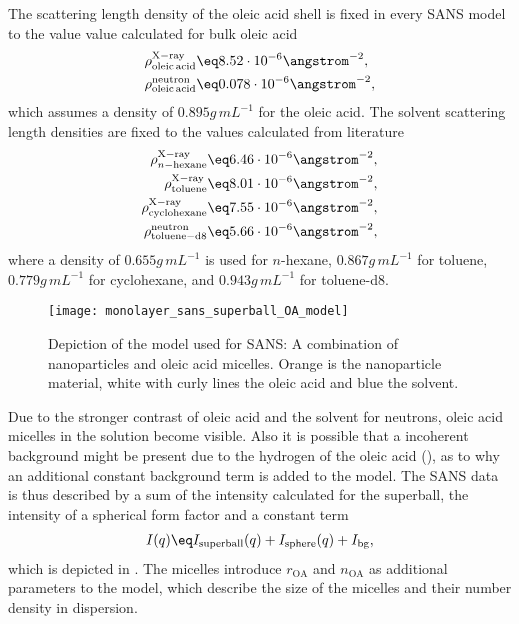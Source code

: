 \documentclass[\main/dresen_thesis.tex]{subfiles}
\begin{document}
    The scattering length density of the oleic acid shell is fixed in every SANS model to the value value calculated for bulk oleic acid
    \begin{align}
      \rho^\mathrm{X-ray}_\mathrm{oleic\,acid} &\eq 8.52 \cdot 10^{-6} \angstrom^{-2},\\
      \rho^\mathrm{neutron}_\mathrm{oleic\,acid} &\eq 0.078 \cdot 10^{-6} \angstrom^{-2},
    \end{align}
    which assumes a density of $0.895 \unit{g\,mL^{-1}}$ for the oleic acid.
    The solvent scattering length densities are fixed to the values calculated from literature
    \begin{align}
      \rho^\mathrm{X-ray}_{n\mathrm{-hexane}}    &\eq 6.46 \cdot 10^{-6} \angstrom^{-2},\\
      \rho^\mathrm{X-ray}_\mathrm{toluene}       &\eq 8.01 \cdot 10^{-6} \angstrom^{-2},\\
      \rho^\mathrm{X-ray}_{\mathrm{cyclohexane}} &\eq 7.55 \cdot 10^{-6} \angstrom^{-2},\\
      \rho^\mathrm{neutron}_\mathrm{toluene-d8}  &\eq 5.66 \cdot 10^{-6} \angstrom^{-2},
    \end{align}
    where a density of $0.655 \unit{g\,mL^{-1}}$ is used for $\mathit{n}$-hexane, $0.867 \unit{g\,mL^{-1}}$ for toluene, $0.779 \unit{g\,mL^{-1}}$ for cyclohexane, and $0.943 \unit{g\,mL^{-1}}$ for toluene-d8.

    \begin{figure}[tb]
      \centering
      \texttt{[image: monolayer\_sans\_superball\_OA\_model]}
      \caption{\label{fig:monolayers:charMethods:SANSModel}Depiction of the model used for SANS: A combination of nanoparticles and oleic acid micelles. Orange is the nanoparticle material, white with curly lines the oleic acid and blue the solvent.}
    \end{figure}

    Due to the stronger contrast of oleic acid and the solvent for neutrons, oleic acid micelles in the solution become visible.
    Also it is possible that a incoherent background might be present due to the hydrogen of the oleic acid (), as to why an additional constant background term is added to the model.
    The SANS data is thus described by a sum of the intensity calculated for the superball, the intensity of a spherical form factor and a constant term
    \begin{align}
      I(q) \eq I_\mathrm{superball}(q) + I_\mathrm{sphere}(q) + I_\mathrm{bg},
    \end{align}
    which is depicted in .
    The micelles introduce $r_\mathrm{OA}$ and $n_\mathrm{OA}$ as additional parameters to the model, which describe the size of the micelles and their number density in dispersion.
\end{document}
